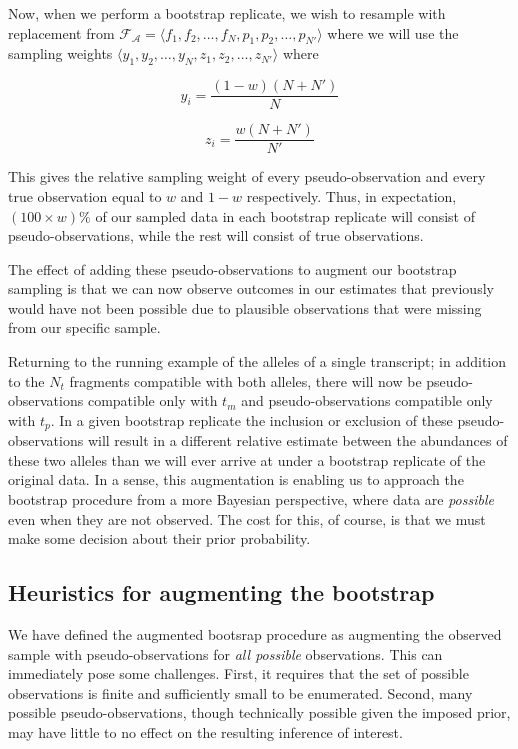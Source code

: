Now, when we perform a bootstrap replicate, we wish to resample with replacement from 
$\mathcal{F_{A}} = \langle f_1, f_2, \dots, f_N, p_1, p_2, \dots, p_{N'} \rangle$ where we will use 
the sampling weights $\langle y_1, y_2, \dots, y_N, z_1, z_2, \dots, z_{N'}\rangle$ where 

$$
y_i = \frac{(1-w) (N+N')}{N}
$$


$$
z_i = \frac{w (N+N')}{N'}
$$

This gives the relative sampling weight of every pseudo-observation and every true observation
equal to $w$ and $1-w$ respectively. Thus, in expectation, $(100 \times w)\%$ of our sampled data 
in each bootstrap replicate will consist of pseudo-observations, while the rest will consist of 
true observations.

The effect of adding these pseudo-observations to augment our bootstrap sampling is that we can now 
observe outcomes in our estimates that previously would have not been possible due to plausible 
observations that were missing from our specific sample.

Returning to the running example of the alleles of a single transcript; in addition to the $N_t$ 
fragments compatible with both alleles, there will now be pseudo-observations compatible only with 
$t_m$ and pseudo-observations compatible only with $t_p$.  In a given bootstrap replicate the 
inclusion or exclusion of these pseudo-observations will result in a different relative estimate 
between the abundances of these two alleles than we will ever arrive at under a bootstrap replicate 
of the original data.  In a sense, this augmentation is enabling us to approach the bootstrap 
procedure from a more Bayesian perspective, where data are \textit{possible} even when they are not 
observed.  The cost for this, of course, is that we must make some decision about their prior probability.

\subsection{Heuristics for augmenting the bootstrap}

We have defined the augmented bootsrap procedure as augmenting the observed sample with 
pseudo-observations for \textit{all possible} observations. This can immediately pose some challenges. 
First, it requires that the set of possible observations is finite and sufficiently small to be 
enumerated. Second, many possible pseudo-observations, though technically possible given the 
imposed prior, may have little to no effect on the resulting inference of interest.

